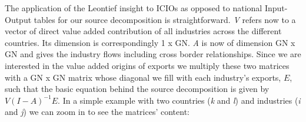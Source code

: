 \documentclass{article}
\begin{document}
The application of the Leontief insight to ICIOs as opposed to national Input-Output tables for our source decomposition is straightforward. \textit{V} refers now to a vector of direct value added contribution of all industries across the different countries. Its dimension is correspondingly 1 x GN. \textit{A} is now of dimension GN x GN and gives the industry flows including cross border relationships. Since we are interested in the value added origins of exports we multiply these two matrices with a GN x GN matrix whose diagonal we fill with each industry's exports, \(E\), such that the basic equation behind the source decomposition is given by \(V(I-A)^{-1}E\). In a simple example with two countries (\textit{k} and \textit{l}) and industries (\textit{i} and \textit{j}) we can zoom in to see the matrices' content:
\end{document}
